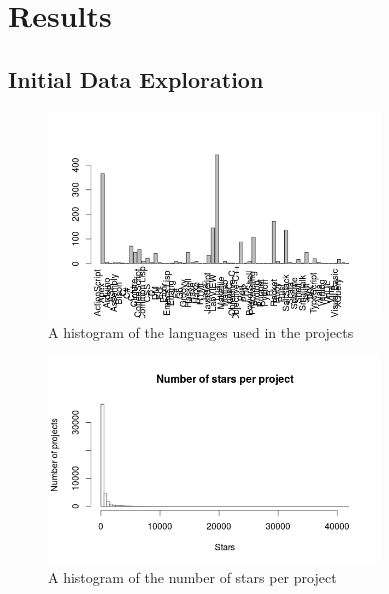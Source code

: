 \section{Results}
    \subsection{Initial Data Exploration}
	    \begin{figure}
	        \includegraphics[width=250pt]{figures/language-frequency}
	        \caption{A histogram of the languages used in the projects}
	        \label{fig:language-frequency-plot}
	    \end{figure}

	    
	    \begin{figure}
	        \includegraphics[width=250pt]{figures/star-distribution}
	        \caption{A histogram of the  number of stars per project}
	        \label{fig:star-distribution-plot}
	    \end{figure}
	    
